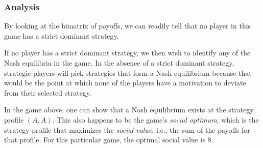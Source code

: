 \documentclass[twoside]{article}
\begin{document}
\subsubsection{Analysis}
By looking at the bimatrix of payoffs, we can readily tell that no player in this game has a strict dominant strategy.

If no player has a strict dominant strategy, we then wish to identify any of the Nash equilibria in the game. In the absence of a strict dominant strategy, strategic players will pick strategies that form a Nash equilibrium because that would be the point at which none of the players have a motivation to deviate from their selected strategy.

In the game above, one can show that a Nash equilibrium exists at the strategy profile $(A, A)$. This also happens to be the game's \textit{social optimum}, which is the strategy profile that maximizes the \textit{social value}, i.e., the sum of the payoffs for that profile. For this particular game, the optimal social value is 8.
\end{document}
